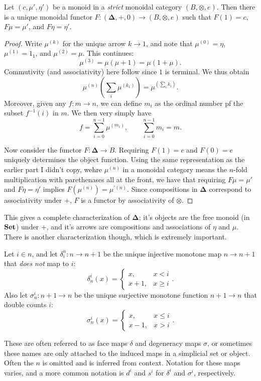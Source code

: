 \begin{proposition}\label{prp:7.2}
	Let $(c,\mu',\eta')$ be a monoid in a \emph{strict} monoidal category $(B,\otimes ,e)$. Then there is a unique monoidal functor $F : (\boldsymbol{\Delta} ,+,0) \to (B,\otimes ,e)$ such that $F(1)=c$, $F\mu=\mu'$, and $F\eta=\eta'$.
\end{proposition}
\begin{proof}
	Write $\mu^{(k)} $ for the unique arrow $k\to 1$, and note that $\mu^{(0)} =\eta$, $\mu^{(1)}= 1_1$, and $\mu^{(2)} =\mu$. This continues:
	\[
		\mu^{(3)} =\mu(\mu+1)=\mu(1+\mu)
	.\]
	Commutivity (and associativity) here follow since $1$ is terminal. We thus obtain
	\[
		\mu^{(n)} \left( \sum_{i} \mu^{(k_1)}  \right) =\mu ^{(\sum_{i} k_i)} 
	.\]
	Moreover, given any $f : m \to n$, we can define $m_i$ as the ordinal number pf the subset $f^{-1} (i)$ in $m$. We then very simply have
	\[
		f=\sum_{i=0}^{n-1} \mu ^{(m_i)} ,\qquad \sum_{i=0}^{n-1} m_i=m
	.\]
	
	Now consider the functor $F : \boldsymbol{\Delta}  \to B$. Requiring $F(1)=c$ and $F(0)=e$ uniquely determines the object function. Using the same representation as the earlier part I didn't copy, wehre $\mu ^{(n)} $ in a monoidal category means the $n$-fold multiplication with parethenases all at the front, we have that requiring $F\mu=\mu'$ and $F\eta=\eta'$ implies $F(\mu^{(n)} )=\mu^{\prime(n)} $. Since compositions in $\boldsymbol{\Delta} $ correspond to associativity under $+$, $F$ is a functor by associativity of $\otimes $.
\end{proof}

This gives a complete characterization of $\boldsymbol{\Delta} $; it's objects are the free monoid (in $\mathbf{Set} $) under $+$, and it's arrows are compositions and associations of $\eta$ and $\mu$. There is another characterization though, which is extremely important.

\begin{definition}\label{dfn:7.6}
	Let $i\in n$, and let $\delta_i^n : n \to n+1$ be the unique injective monotone map $n\to n+1$ that \emph{does not} map to $i$:
	\[
		\delta_n^i(x)=
		\begin{cases}
			x,&x<i\\
			x+1,&x\geq i
		\end{cases}
	.\]
	Also let $\sigma_n^i : n+1 \to n$ be the unique surjective monotone function $n+1\to n$ that double counts $i$:
	\[
		\sigma_n^i(x)=
		\begin{cases}
			x,&x\leq i\\
			x-1,&x>i
		\end{cases}
	.\]
\end{definition}
These are often referred to as face maps $\delta$ and degeneracy maps $\sigma$, or sometimes these names are only attached to the induced maps in a simplicial set or object. Often the $n$ is omitted and is inferred from context. Notation for these maps varies, and a more common notation is $d^i$ and $s^i$ for $\delta^i$ and $\sigma^i$, respectively.

